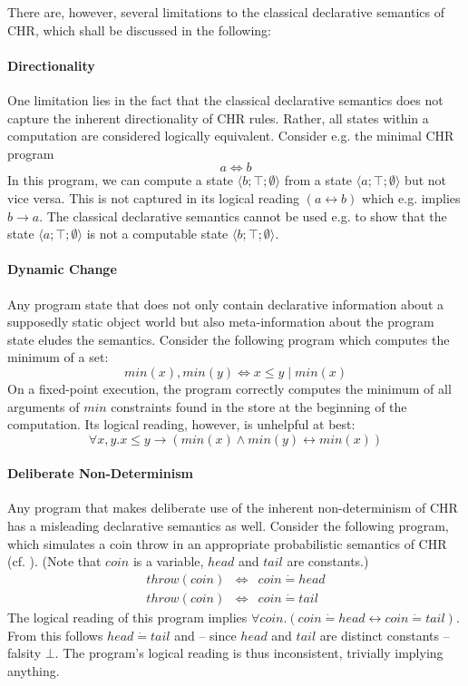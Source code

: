 \documentclass[acmtocl]{acmtrans2m}
\newcommand{\de}{\dot=}
\newcommand\state[1]{\langle #1 \rangle}
\begin{document}
There are, however, several limitations to the classical declarative semantics
of CHR, which shall be discussed in the following:

\paragraph*{Directionality} One limitation lies in the fact that the classical
declarative semantics does not capture the inherent directionality of CHR rules.
Rather, all states within a computation are considered logically equivalent.
Consider e.g. the minimal CHR program
\[
  a \Leftrightarrow b
\]
In this program, we can compute a state $\state{b;\top;\emptyset}$ from a state
$\state{a;\top;\emptyset}$ but not vice versa. This is not captured in its
logical reading $(a\leftrightarrow b)$ which e.g. implies $b\rightarrow a$.
The classical declarative semantics cannot be used e.g. to show that the state
$\state{a;\top;\emptyset}$ is not a computable state
$\state{b;\top;\emptyset}$.

\paragraph*{Dynamic Change} Any program state that does not only
contain declarative information about a supposedly static object world but also
meta-information about the program state eludes the semantics. Consider the
following program which computes the minimum of a set:
\[
  min(x),min(y)\Leftrightarrow x\leq y \mid min(x)
\]
On a fixed-point execution, the program correctly computes the minimum of all
arguments of $min$ constraints found in the store at the beginning of the
computation. Its logical reading, however, is unhelpful at best:
\[
	\forall x,y.
	x\leq y \rightarrow(min(x)\wedge min(y)\leftrightarrow min(x))
\]

\paragraph*{Deliberate Non-Determinism} Any program that makes deliberate use of
the inherent non-determinism of CHR has a misleading declarative semantics as
well. Consider the following program, which simulates a coin throw in an appropriate
probabilistic semantics of CHR (cf. ).
(Note that $coin$ is a variable, $head$ and $tail$ are constants.)
\[
  \begin{array}{lcl}
    throw(coin) & \Leftrightarrow & coin \de head \\
    throw(coin) & \Leftrightarrow & coin \de tail
  \end{array}
\]
The logical reading of this program implies $\forall coin.(coin\de
head\leftrightarrow coin\de tail)$. From this follows $head\de tail$ and -- since
$head$ and $tail$ are distinct constants -- falsity $\bot$. The program's logical
reading is thus inconsistent, trivially implying anything.
\end{document}
